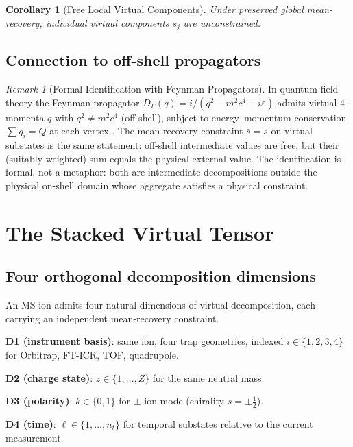 \documentclass[twocolumn,10pt,a4paper]{article}
\theoremstyle{thmstyle}
\newtheorem{corollary}[theorem]{Corollary}
\theoremstyle{definition}
\theoremstyle{remark}
\newtheorem{remark}[theorem]{Remark}
\begin{document}
\begin{corollary}[Free Local Virtual Components]
\label{cor:freeloc}
Under preserved global mean-recovery, individual virtual components
$s_{j}$ are unconstrained.
\end{corollary}

\subsection{Connection to off-shell propagators}

\begin{remark}[Formal Identification with Feynman Propagators]
\label{rem:feyn}
In quantum field theory the Feynman propagator
$D_{F}(q)=i/(q^{2}-m^{2}c^{4}+i\varepsilon)$ admits virtual
4-momenta $q$ with $q^{2}\neq m^{2}c^{4}$ (off-shell), subject to
energy--momentum conservation $\sum q_{i}=Q$ at each vertex
\citep{peskin1995}. The mean-recovery constraint $\bar s=s$ on
virtual substates is the same statement: off-shell intermediate
values are free, but their (suitably weighted) sum equals the
physical external value. The identification is formal, not a
metaphor: both are intermediate decompositions outside the physical
on-shell domain whose aggregate satisfies a physical constraint.
\end{remark}

\section{The Stacked Virtual Tensor}
\label{sec:tensor}

\subsection{Four orthogonal decomposition dimensions}

An MS ion admits four natural dimensions of virtual decomposition,
each carrying an independent mean-recovery constraint.

\textbf{D1 (instrument basis)}: same ion, four trap geometries,
indexed $i\in\{1,2,3,4\}$ for Orbitrap, FT-ICR, TOF, quadrupole.

\textbf{D2 (charge state)}: $z\in\{1,\ldots,Z\}$ for the same neutral
mass.

\textbf{D3 (polarity)}: $k\in\{0,1\}$ for $\pm$ ion mode (chirality
$s=\pm\tfrac{1}{2}$).

\textbf{D4 (time)}: $\ell\in\{1,\ldots,n_{t}\}$ for temporal substates
relative to the current measurement.
\end{document}
